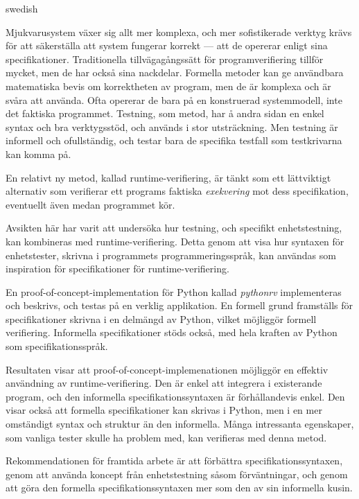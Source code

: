 \documentclass[a4paper,11pt]{kth-mag}
\theoremstyle{definition}
\begin{document}
\begin{foreignabstract}{swedish}

Mjukvarusystem växer sig allt mer komplexa, och mer sofistikerade verktyg
krävs för att säkerställa att system fungerar korrekt --- att de opererar
enligt sina specifikationer. Traditionella tillvägagångssätt för
programverifiering tillför mycket, men de har också sina nackdelar. Formella
metoder kan ge användbara matematiska bevis om korrektheten av program, men de
är komplexa och är svåra att använda. Ofta opererar de bara på en
konstruerad systemmodell, inte det faktiska programmet. Testning, som metod,
har å andra sidan en enkel syntax och bra verktygsstöd, och används i stor
utsträckning. Men testning är informell och ofullständig, och testar bara de
specifika testfall som testkrivarna kan komma på.

En relativt ny metod, kallad runtime-verifiering, är tänkt som ett lättviktigt
alternativ som verifierar ett programs faktiska \textit{exekvering} mot dess
specifikation, eventuellt även medan programmet kör.

Avsikten här har varit att undersöka hur testning, och specifikt
enhetstestning, kan kombineras med runtime-verifiering. Detta genom att visa
hur syntaxen för enhetstester, skrivna i programmets programmeringsspråk, kan
användas som inspiration för specifikationer för runtime-verifiering.

En proof-of-concept-implementation för Python kallad \textit{pythonrv}
implementeras och beskrivs, och testas på en verklig applikation. En formell
grund framställs för specifikationer skrivna i en delmängd av Python, vilket
möjliggör formell verifiering. Informella specifikationer stöds också, med hela
kraften av Python som specifikationsspråk.

Resultaten visar att proof-of-concept-implemenationen möjliggör en effektiv
användning av runtime-verifiering. Den är enkel att integrera i existerande
program, och den informella specifikationssyntaxen är förhållandevis enkel. Den
visar också att formella specifikationer kan skrivas i Python, men i en mer
omständigt syntax och struktur än den informella. Många intressanta egenskaper,
som vanliga tester skulle ha problem med, kan verifieras med denna metod.

Rekommendationen för framtida arbete är att förbättra specifikationssyntaxen,
genom att använda koncept från enhetstestning såsom förväntningar, och genom
att göra den formella specifikationssyntaxen mer som den av sin informella
kusin.

\end{foreignabstract}
\clearpage
\end{document}
